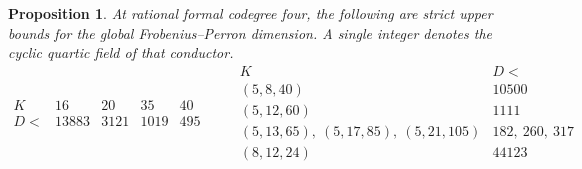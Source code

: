 \documentclass[11pt,a4paper]{article}
\newtheorem{proposition}[theorem]{Proposition}
\numberwithin{equation}{section}
\begin{document}
\begin{proposition}\label{prop:quartic-four-effective}
At rational formal codegree four, the following are strict upper bounds for the global Frobenius--Perron dimension. A single integer denotes the cyclic quartic field of that conductor.
\[
\begin{array}{c|rrrr}
K&16&20&35&40\\\hline
D<&13883&3121&1019&495
\end{array}
\qquad
\begin{array}{c|r}
K&D<\\\hline
(5,8,40)&10500\\
(5,12,60)&1111\\
(5,13,65),\ (5,17,85),\ (5,21,105)&182,\ 260,\ 317\\
(8,12,24)&44123
\end{array}
\]
\end{proposition}
\end{document}
